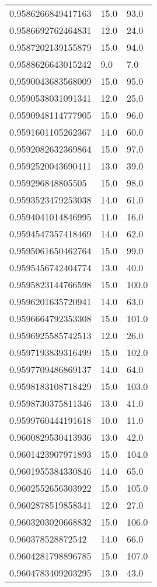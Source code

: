 \begin{center}
\begin{supertabular}[H]{p{0.30\textwidth}p{0.05\textwidth}p{0.05\textwidth}}
0.9586266849417163 & 15.0 & 93.0 \\ 
0.9586692762464831 & 12.0 & 24.0 \\ 
0.9587202139155879 & 15.0 & 94.0 \\ 
0.9588626643015242 & 9.0 & 7.0 \\ 
0.9590043683568009 & 15.0 & 95.0 \\ 
0.9590538031091341 & 12.0 & 25.0 \\ 
0.9590948114777905 & 15.0 & 96.0 \\ 
0.9591601105262367 & 14.0 & 60.0 \\ 
0.9592082632369864 & 15.0 & 97.0 \\ 
0.9592520043690411 & 13.0 & 39.0 \\ 
0.959296848805505 & 15.0 & 98.0 \\ 
0.9593523479253038 & 14.0 & 61.0 \\ 
0.9594041014846995 & 11.0 & 16.0 \\ 
0.9594547357418469 & 14.0 & 62.0 \\ 
0.9595061650462764 & 15.0 & 99.0 \\ 
0.9595456742404774 & 13.0 & 40.0 \\ 
0.9595823144766598 & 15.0 & 100.0 \\ 
0.9596201635720941 & 14.0 & 63.0 \\ 
0.9596664792353308 & 15.0 & 101.0 \\ 
0.9596925585742513 & 12.0 & 26.0 \\ 
0.9597193839316499 & 15.0 & 102.0 \\ 
0.9597709486869137 & 14.0 & 64.0 \\ 
0.9598183108718429 & 15.0 & 103.0 \\ 
0.9598730375811346 & 13.0 & 41.0 \\ 
0.9599760444191618 & 10.0 & 11.0 \\ 
0.9600829530413936 & 13.0 & 42.0 \\ 
0.9601423907971893 & 15.0 & 104.0 \\ 
0.9601955384330846 & 14.0 & 65.0 \\ 
0.9602552656303922 & 15.0 & 105.0 \\ 
0.9602878519858341 & 12.0 & 27.0 \\ 
0.9603203020668832 & 15.0 & 106.0 \\ 
0.960378528872542 & 14.0 & 66.0 \\ 
0.9604281798896785 & 15.0 & 107.0 \\ 
0.9604783409203295 & 13.0 & 43.0 \\ 

\end{supertabular}
\end{center}
